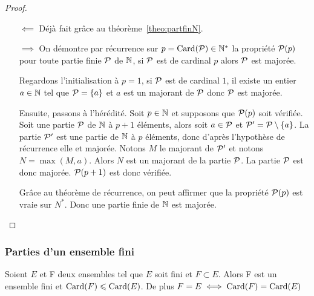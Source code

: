 \begin{proof}
  \begin{itemize}
    \item[\(\impliedby\)] Déjà fait grâce au théorème~\ref{theo:partfinN}.
    \item[\(\implies\)] On démontre par récurrence sur \(p = \Card(\P)\in
      \N^*\) la propriété \(\P(p)\) pour toute partie finie \(\P\) de
      \(\N\), si \(\P\) est de cardinal \(p\) alors \(\P\) est majorée.

      Regardons l'initialisation à \(p = 1\), si \(\P\) est de cardinal
      \(1\), il existe un entier \(a\in\N\) tel que \(\P = \{a\}\) et \(a\)
      est un majorant de \(\P\) donc \(\P\) est majorée.

      Ensuite, passons à l'hérédité. Soit \(p \in \N\) et supposons que
      \(\P(p)\) soit vérifiée. Soit une partie \(\P\) de \(\N\) à \(p + 1\)
      éléments, alors soit \(a\in \P\) et \(\P' = \P\setminus\{a\}\). La
      partie \(\P'\) est une partie de \(\N\) à \(p\) éléments, donc d'après
      l'hypothèse de récurrence elle et majorée. Notons \(M\) le majorant de
      \(\P'\) et notons \(N = \max(M, a)\). Alors \(N\) est un majorant de
      la partie \(\P\). La partie \(\P\) est donc majorée. \(\P(p + 1)\) est
      donc vérifiée.

      Grâce au théorème de récurrence, on peut affirmer que la propriété
      \(\P(p)\) est vraie sur \(N^*\). Donc une partie finie de \(\N\) est
      majorée.
  \end{itemize}
\end{proof}

\subsubsection{Parties d'un ensemble fini}

\begin{theo}
  \label{theo:partiesfinies}
  Soient \(E\) et F deux ensembles tel que \(E\) soit fini et \(F\subset
  E\).  Alors F est un ensemble fini et \(\Card(F)\leqslant\Card(E)\). De
  plus \(F = E \iff \Card(F) = \Card(E)\)
\end{theo}


